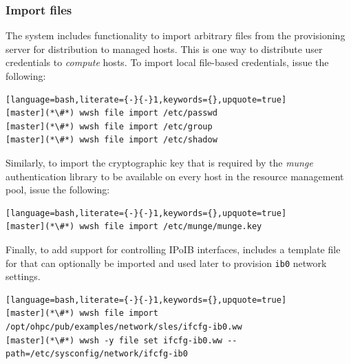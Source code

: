\documentclass[letterpaper]{article}
\begin{document}


\subsubsection{Import files} \label{sec:file_import}

The \Warewulf{} system includes functionality to import arbitrary files from the
provisioning server for distribution to managed hosts. This is one way
to distribute user credentials to {\em compute} hosts. To
import local file-based credentials, issue the following:

\begin{lstlisting}[language=bash,literate={-}{-}1,keywords={},upquote=true]
[master](*\#*) wwsh file import /etc/passwd                                                          
[master](*\#*) wwsh file import /etc/group
[master](*\#*) wwsh file import /etc/shadow 
\end{lstlisting}

Similarly, to import the cryptographic key that is required by the {\em munge}
authentication library to be available on every host in the resource management
pool, issue the following:

\begin{lstlisting}[language=bash,literate={-}{-}1,keywords={},upquote=true]
[master](*\#*) wwsh file import /etc/munge/munge.key
\end{lstlisting}

Finally, to add support for controlling IPoIB interfaces, \OHPC{} includes a
template file for \Warewulf{} that can optionally be imported and used later to provision
\texttt{ib0} network settings.

\begin{lstlisting}[language=bash,literate={-}{-}1,keywords={},upquote=true]
[master](*\#*) wwsh file import /opt/ohpc/pub/examples/network/sles/ifcfg-ib0.ww
[master](*\#*) wwsh -y file set ifcfg-ib0.ww --path=/etc/sysconfig/network/ifcfg-ib0
\end{lstlisting}



\end{document}
